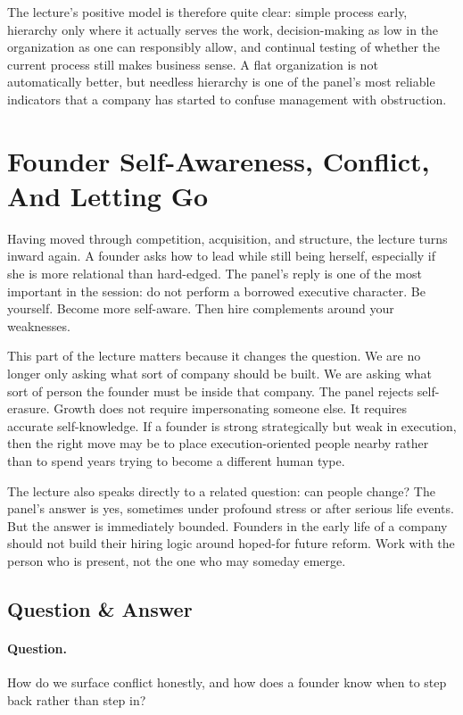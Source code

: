 The lecture's positive model is therefore quite clear: simple process early, hierarchy only where it actually serves the work, decision-making as low in the organization as one can responsibly allow, and continual testing of whether the current process still makes business sense. A flat organization is not automatically better, but needless hierarchy is one of the panel's most reliable indicators that a company has started to confuse management with obstruction.

\section{Founder Self-Awareness, Conflict, And Letting Go}

Having moved through competition, acquisition, and structure, the lecture turns inward again. A founder asks how to lead while still being herself, especially if she is more relational than hard-edged. The panel's reply is one of the most important in the session: do not perform a borrowed executive character. Be yourself. Become more self-aware. Then hire complements around your weaknesses.

This part of the lecture matters because it changes the question. We are no longer only asking what sort of company should be built. We are asking what sort of person the founder must be inside that company. The panel rejects self-erasure. Growth does not require impersonating someone else. It requires accurate self-knowledge. If a founder is strong strategically but weak in execution, then the right move may be to place execution-oriented people nearby rather than to spend years trying to become a different human type.

The lecture also speaks directly to a related question: can people change? The panel's answer is yes, sometimes under profound stress or after serious life events. But the answer is immediately bounded. Founders in the early life of a company should not build their hiring logic around hoped-for future reform. Work with the person who is present, not the one who may someday emerge.

\subsection{Question \& Answer}

\paragraph{Question.} How do we surface conflict honestly, and how does a founder know when to step back rather than step in?


